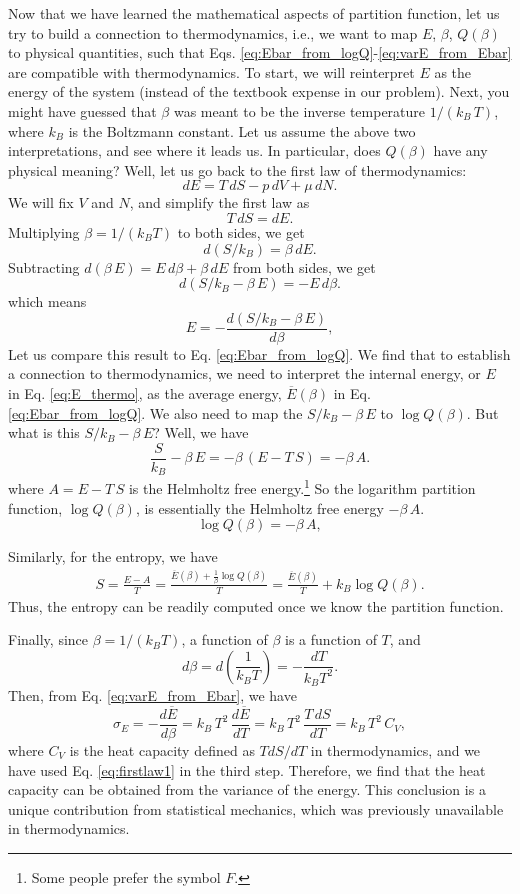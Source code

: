 \documentclass{article}
\begin{document}
Now that we have learned the mathematical aspects of partition function,
let us try to build a connection to thermodynamics,
i.e., we want to map $E$, $\beta$, $Q(\beta)$
to physical quantities, such that
Eqs. \eqref{eq:Ebar_from_logQ}-\eqref{eq:varE_from_Ebar}
are compatible with thermodynamics.
%
To start, we will reinterpret $E$ as the energy of the system
(instead of the textbook expense in our problem).
%
Next, you might have guessed that $\beta$
was meant to be the inverse temperature $1/(k_B \, T)$,
where $k_B$ is the Boltzmann constant.
%
Let us assume the above two interpretations, and see where it leads us.
In particular,
does $Q(\beta)$ have any physical meaning?
%
Well, let us go back to the first law of thermodynamics:
$$
dE = T \, dS - p \, dV + \mu \, dN.
$$
We will fix $V$ and $N$, and simplify the first law as
\begin{equation}
  T \, dS = dE.
  \label{eq:firstlaw1}
\end{equation}
Multiplying $\beta = 1/(k_B T)$ to both sides, we get
$$
d(S/k_B) = \beta \, dE.
$$
Subtracting $d(\beta \, E) = E \, d\beta + \beta \, dE$ from both sides, we get
$$
d(S/k_B - \beta \, E) = -E \, d\beta.
$$
which means
\begin{equation}
  E
  =
  -
  \frac{ d(S/k_B - \beta \, E) } { d\beta }
  ,
  \label{eq:E_thermo}
\end{equation}
%
Let us compare this result to Eq. \eqref{eq:Ebar_from_logQ}.
We find that to establish a connection to thermodynamics,
we need to
interpret the internal energy, or $E$ in Eq. \eqref{eq:E_thermo},
as the average energy, $\overline E(\beta)$ in Eq. \eqref{eq:Ebar_from_logQ}.
%
We also need to map the $S/k_B -\beta \, E$ to $\log Q(\beta)$.
%
But what is this $S/k_B - \beta \, E$?
Well, we have
$$
\frac{S}{k_B} - \beta \, E
=
-\beta \, (E - T \, S)
=
-\beta \, A.
$$
where $A = E - T \, S$ is the Helmholtz free energy.\footnote{
Some people prefer the symbol $F$.}
%
So the logarithm partition function, $\log Q(\beta)$,
is essentially the Helmholtz free energy $-\beta \, A$.
$$
\log Q(\beta) = -\beta \, A,
$$

Similarly, for the entropy, we have
\begin{align*}
  S = \frac{ E - A } { T }
  = \frac{ \overline E(\beta) + \frac{1}{\beta} \log Q(\beta) } { T }
  = \frac{ \overline E(\beta) } {T } + k_B \log Q(\beta)
  .
\end{align*}
%
Thus, the entropy can be readily computed once we know the partition function.

Finally, since $\beta = 1/(k_B T)$,
a function of $\beta$ is a function of $T$,
and
$$
d\beta = d\left( \frac{1}{k_B T} \right) = -\frac{dT}{k_B T^2}.
$$
Then, from Eq. \eqref{eq:varE_from_Ebar}, we have
$$
\sigma_E = -\frac{d \overline E } { d\beta}
= k_B \, T^2 \, \frac{d\overline E}{dT}
= k_B \, T^2 \, \frac{ T \, dS }{dT} = k_B \, T^2 \, C_V,
$$
where $C_V$ is the heat capacity defined as $TdS/dT$ in thermodynamics,
and we have used Eq. \eqref{eq:firstlaw1}
in the third step.
%
Therefore, we find that the heat capacity can be obtained
from the variance of the energy.
%
This conclusion is a unique contribution from statistical mechanics,
which was previously unavailable in thermodynamics.
\end{document}
